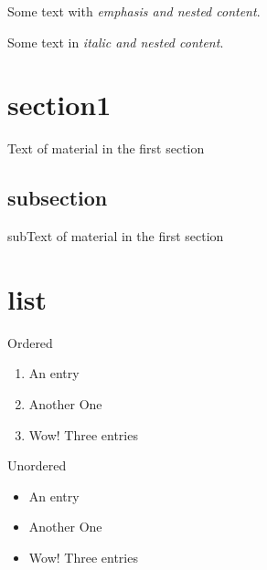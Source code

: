 \documentclass{article}
\begin{document}
	Some text with \emph{emphasis and \emph{nested} content}.
	
	Some text in \textit{italic and \textit{nested} content}.
	
	\section{section1}
	
	Text of material in the first section
	
	\subsection{subsection}
	
	subText of material in the first section
	
	\section{list}
	Ordered
	\begin{enumerate}
		\item An entry
		\item Another One
		\item Wow! Three entries
	\end{enumerate}
	
	Unordered
	\begin{itemize}
		\item An entry
		\item Another One
		\item Wow! Three entries
	\end{itemize}
	
\end{document}
